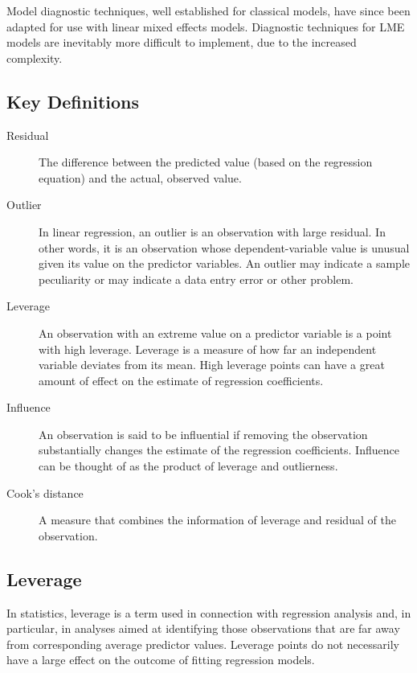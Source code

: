 \documentclass[12pt, a4paper]{article}
\begin{document}
			Model diagnostic techniques, well established for classical models, have since been adapted for use with linear mixed effects models. Diagnostic techniques for LME models are inevitably more difficult to implement, due to the increased complexity.
			

\subsection{Key Definitions}
\begin{description}
	\item[ Residual] The difference between the predicted value (based on the regression equation) and the actual, observed value.
	
	\item[ Outlier] In linear regression, an outlier is an observation with large residual. In other words, it is an observation whose dependent-variable value is unusual given its value on the predictor variables. An outlier may indicate a sample peculiarity or may indicate a data entry error or other problem.
	
	\item[ Leverage] An observation with an extreme value on a predictor variable is a point with high leverage. Leverage is a measure of how far an independent variable deviates from its mean. High leverage points can have a great amount of effect on the estimate of regression coefficients.
	
	\item[ Influence] An observation is said to be influential if removing the observation substantially changes the estimate of the regression coefficients.  Influence can be thought of as the product of leverage and outlierness.
	
	\item[ Cook's distance ] A measure that combines the information of leverage and residual of the observation.
\end{description}


\subsection{Leverage}
In statistics, leverage is a term used in connection with regression analysis and, in particular, in analyses aimed at identifying those observations that are far away from corresponding average predictor values. Leverage points do not necessarily have a large effect on the outcome of fitting regression models.
\end{document}

